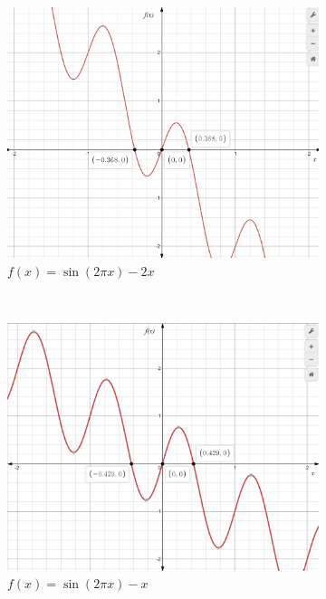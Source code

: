 \documentclass[11pt]{article}
\newcommand{\1}{\mathbbm{1}}
\begin{document}
\begin{figure}[htbp]
	\centering
	\begin{subfigure}[b]{0.48\textwidth}
		\includegraphics[width=\textwidth]{f1.png}
		\caption{$f(x)=\sin(2\pi x)-2x$}
		\label{3a}
	\end{subfigure}
	~
	\begin{subfigure}[b]{0.48\textwidth}
		\includegraphics[width=\textwidth]{f2.png}
		\caption{$f(x)=\sin(2\pi x)-x$}
		\label{3c}
	\end{subfigure}
	\newline
	\begin{subfigure}[b]{0.48\textwidth}

\end{subfigure}
\end{figure}
\end{document}
